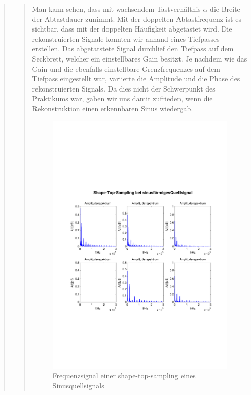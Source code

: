 \begin{quote}
\begin{quote}
      	    Man kann sehen, dass mit wachsendem Tastverhältnis $\alpha$ die Breite
      	    der Abtastdauer zunimmt. Mit der doppelten Abtastfrequenz ist es
      	    sichtbar, dass mit der doppelten Häufigkeit abgetastet wird. Die
      	    rekonstruierten Signale konnten wir anhand eines Tiefpasses erstellen.
      	    Das abgetatstete Signal durchlief den Tiefpass auf dem Seckbrett,
      	    welcher ein einstellbares Gain besitzt. Je nachdem wie das Gain und die
      	    ebenfalls einstellbare Grenzfrequenzes auf dem Tiefpass eingestellt
      	    war, variierte die Amplitude und die Phase des rekonstruierten Signals.
      	    Da dies nicht der Schwerpunkt des Praktikums war, gaben wir uns damit
      	    zufrieden, wenn die Rekonstruktion einen erkennbaren Sinus wiedergab.\\
      	    
      	    
        	\begin{figure}[H]
            \centering
            \includegraphics[scale=0.6, trim = 1.5cm 6cm 1cm 8cm,
            clip]{./Bilder/shape-top-sinus_freq}
                \caption{Frequenzsignal einer shape-top-sampling eines Sinusquellsignals}
      	    \end{figure}
      	    

\end{quote}
\end{quote}
